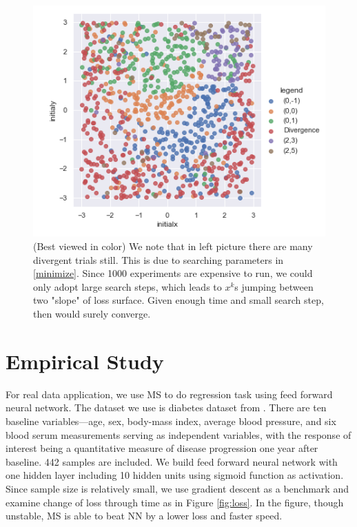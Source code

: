\documentclass[10pt, oneside]{article}
\begin{document}
  \begin{figure}[H]
\centering

  \includegraphics[width=0.8\linewidth]{figure/convergence1.png}

   \caption{(Best viewed in color) We note that in left picture there are many divergent trials still. This is due to searching parameters in \ref{minimize}. Since 1000 experiments are expensive to run, we could only adopt large search steps, which leads to $x^k$s jumping between two "slope" of loss surface. Given enough time and small search step, then would surely converge.}
\label{fig:convergence}
  \end{figure}
  

\section{Empirical Study}

For real data application, we use MS to do regression task using feed forward neural network. The dataset we use is diabetes dataset from \cite{lars}. There are ten baseline variables---age, sex, body-mass index, average blood pressure, and six blood serum measurements serving as independent variables, with the response of interest being a quantitative measure of disease progression one year after baseline. 442 samples are included. We build feed forward neural network with one hidden layer including 10 hidden units using sigmoid function as activation. Since sample size is relatively small, we use gradient descent as a benchmark and examine change of loss through time as in Figure \ref{fig:loss}. In the figure, though unstable, MS is able to beat NN by a lower loss and faster speed. 
\end{document}
